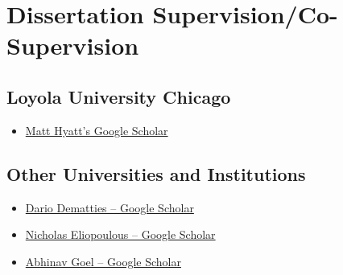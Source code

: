 \section{Dissertation Supervision/Co-Supervision}

\subsection{Loyola University Chicago}


\begin{itemize}

\item \href{https://scholar.google.com/citations?user=SXv-oqYAAAAJ&hl=en}{Matt Hyatt's Google Scholar}

\end{itemize}




\subsection{Other Universities and Institutions}

\begin{itemize}
	\item \href {https://scholar.google.com/citations?user=vpMd1bIAAAAJ&hl=en}{Dario Dematties -- Google Scholar}
\end{itemize}

\begin{itemize}
	\item \href{https://scholar.google.com/citations?user=GFNuJCQAAAAJ&hl=en}{Nicholas Eliopoulous -- Google Scholar}
\end{itemize}



\begin{itemize}
	\item \href{https://scholar.google.com/citations?user=LvJvM7kAAAAJ&hl=en}{Abhinav Goel -- Google Scholar}
\end{itemize}

